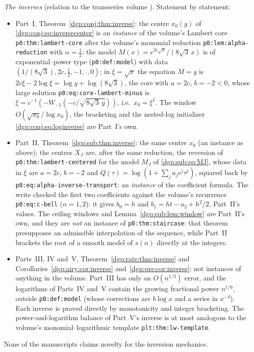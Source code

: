 \documentclass[11pt,letterpaper]{article}
\numberwithin{equation}{section}
\theoremstyle{remark}\newtheorem{remark}[theorem]{Remark}
\newcommand{\file}[1]{\nolinkurl{#1}}
\begin{document}
\emph{The inverses} (relation to the transseries volume \cite{TSvol}). Statement by statement:
\begin{itemize}
\item Part~I, Theorem~\ref{dgp:conj:thm:inverse}: the centre $x_0(y)$ of \eqref{dgp:conj:eq:inversecenter} is an \emph{instance} of the volume's Lambert core \file{p0:thm:lambert-core} after the volume's monomial reduction \file{p0:lem:alpha-reduction} with $\alpha=\frac12$: the model $M(x)=e^{2c\sqrt x}/(8\sqrt3\,x)$ is of exponential--power type (\file{p0:def:model}) with data $(1/(8\sqrt3),2c,\frac12,-1,\cdot,0)$; in $\xi=\sqrt x$ the equation $M=y$ is $2c\xi-2\log\xi=\log y+\log(8\sqrt3)$, the core with $a=2c$, $b=-2<0$, whose large solution \file{p0:eq:core-lambert-minus} is $\xi=c^{-1}(-W_{-1}(-c/\sqrt{8\sqrt3\,y}))$, i.e.\ $x_0=\xi^2$. The window $O(\sqrt{x_0}/\log x_0)$, the bracketing and the nested-log initializer \eqref{dgp:conj:eq:loginverse} are Part~I's own.
\item Part~II, Theorem~\ref{dgp:sub:thm:inverse}: the same centre $x_0$ (an instance as above); the centres $X_J$ are, after the same reduction, the reversion of \file{p0:thm:lambert-centered} for the model $M_J$ of \eqref{dgp:sub:eq:MJ}, whose data in $\xi$ are $a=2c$, $b=-2$ and $Q(\tau)=\log(1+\sum_ja_jc^j\tau^j)$, squared back by \file{p0:eq:alpha-inverse-transport}: an \emph{instance} of the coefficient formula. The write checked the first two coefficients against the volume's recurrence \file{p0:eq:c-bell} ($n=1,2$): it gives $b_0=h$ and $b_1=ht-a_2+h^2/2$, Part~II's values. The ceiling windows and Lemma~\ref{dgp:sub:lem:window} are Part~II's own, and they are \emph{not} an instance of \file{p0:thm:staircase}: that theorem presupposes an admissible interpolation of the sequence, while Part~II brackets the root of a smooth model of $s(n)$ directly at the integers.
\item Parts~III, IV and~V, Theorem~\ref{dgp:rate:thm:inverse} and Corollaries~\ref{dgp:airy:cor:inverse} and~\ref{dgp:pre:cor:inverse}: not instances of anything in the volume. Part~III has only an $O(n^{1/3})$ error, and the logarithms of Parts~IV and~V contain the growing fractional power $n^{1/6}$, outside \file{p0:def:model} (whose corrections are $b\log x$ and a series in $x^{-\delta}$). Each inverse is proved directly by monotonicity and integer bracketing. The power-and-logarithm balance of Part~V's inverse is at most analogous to the volume's monomial--logarithmic template \file{plt:thm:lw-template}.
\end{itemize}
None of the manuscripts claims novelty for the inversion mechanics.
\end{document}
